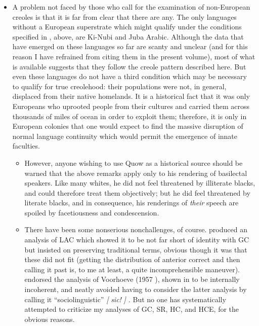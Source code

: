 \begin{itemize}
\begin{itemize}
\begin{itemize}
\begin{itemize}
\begin{itemize}
\begin{itemize}
\item A problem not faced by those who call for the examination of non-European creoles is that it is far from clear that there are any. The only languages without a European superstrate which might qualify under the conditions specified in , above, are Ki-Nubi and Juba Arabic. Although the data that have emerged on these lan\-guages so far are scanty and unclear (and for this reason I have refrained from citing them in the present volume), most of what is available suggests that they follow the creole pattern described here. But even these languages do not have a third condition which may be necessary to qualify for true creolehood: their populations were not, in general, displaced from their native homelands. It is a historical fact that it was only Europeans who uprooted people from their cultures and carried them across thousands of miles of ocean in order to exploit them;
therefore, it is only in European colonies that one would expect to find the massive disruption of normal language continuity which would permit the emergence of innate faculties.

\begin{itemize}
\item However, anyone wishing to use Quow as a historical source should be warned that the above remarks apply only to his rendering of basilectal speakers. Like many whites, he did not feel threatened by illiterate blacks, and could therefore treat them objectively; but he did feel threatened by literate blacks, and in consequence, his ren\-derings of \textit{their} speech are spoiled by facetiousness and condescension.
\item There have been some nonserious nonchallenges, of course. \citet{Christie1976} produced an analysis of LAC which showed it to be not far short of identity with GC but insisted on preserving traditional terms, obvious though it was that these did not fit (getting the distri\-bution of anterior correct and then calling it past is, to me at least, a quite incomprehensible maneuver). \citet{Seuren1980} endorsed the analysis of Voorhoeve (1957 ), shown in \citet{Bickerton1975} to be intern\-ally incoherent, and neatly avoided having to consider the latter analy\-sis by calling it ``sociolinguistic'' \textit{[} \textit{sic!} \textit{]} \textit{.} But no one has systematically attempted to criticize my analyses of GC, SR, HC, and HCE, for the obvious reasons.


\end{itemize}
\end{itemize}
\end{itemize}
\end{itemize}
\end{itemize}
\end{itemize}
\end{itemize}
